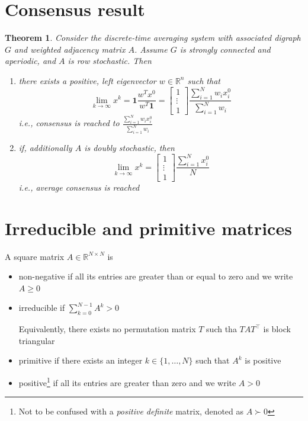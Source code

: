 \documentclass{book}
\newcommand{\R}{\mathbb{R}}
\theoremstyle{theoremv2}
\newtheorem{theorem}{Theorem}[chapter]
\theoremstyle{defv2}
\theoremstyle{remark}
\theoremstyle{remark}
\theoremstyle{definition}
\theoremstyle{definition}
\begin{document}
\section{Consensus result}
\begin{theorem}
    Consider the discrete-time averaging system with associated digraph $G$ and weighted adjacency matrix $A$. Assume $G$ is strongly connected and aperiodic, and $A$ is row stochastic. Then 
    \begin{enumerate}
        \item there exists a positive, left eigenvector $w\in\R^n$ such that 
            \[
                \lim_{k\to\infty} x^k = \boldsymbol{1} \displaystyle\frac{w^T x^0}{w^T \boldsymbol{1}} = \begin{bmatrix}
                    1 \\ \vdots \\ 1 
                \end{bmatrix} \displaystyle\frac{\sum_{i=1}^{N}w_ix_i^0}{\sum_{i=1}^{N}w_i}
            \]
            i.e., consensus is reached to $\displaystyle\frac{\sum_{i=1}^{N}w_ix_i^0}{\sum_{i=1}^{N}w_i}$
            \item if, additionally $A$ is doubly stochastic, then 
                \[
                    \lim_{k\to\infty} x^k = \begin{bmatrix}
                    1 \\ \vdots \\ 1 
                \end{bmatrix} \frac{\sum_{i=1}^{N}x_i^0}{N}
                \]
                i.e., \emph{average} consensus is reached
    \end{enumerate}
\end{theorem}


\section{Irreducible and primitive matrices}
A square matrix $A\in\R^{N\times N}$ is 
\begin{itemize}
    \item non-negative if all its entries are greater than or equal to zero and we write $A\geq 0$
        \item irreducible if $\sum_{k=0}^{N-1}A^k>0$

            Equivalently, there exists no permutation matrix $T$ such tha $TAT^\top$ is block triangular
        \item primitive if there exists an integer $k\in\{1,\dots,N\}$ such that $A^k$ is positive
        \item positive\footnote{Not to be confused with a \emph{positive definite} matrix, denoted as $A \succ 0$} if all its entries are greater than zero and we write $A>0$
\end{itemize}
\end{document}
